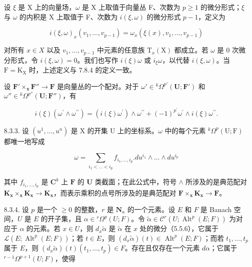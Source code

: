 设 \(\xi\) 是 X 上的向量场，\(\omega\) 是 X 上取值于向量丛 F、次数为 \(p \geqslant 1\) 的微分形式；\(\xi\) 与 \(\omega\) 的内积是 X 上取值于 F、次数为 \(i(\xi, \omega)\) 的微分形式 \(p - 1\)，定义为

\[
i (\xi , \omega) _ {x} (v _ {1}, \dots , v _ {p - 1}) = \omega_ {x} (\xi (x), v _ {1}, \dots , v _ {p - 1})\tag{3}
\]

对所有 \(x \in X\) 以及 \(v_{1}, \ldots, v_{p-1}\) 中元素的任意族 \(\mathrm{T}_{x}(\mathrm{X})\) 都成立。若 \(\omega\) 是 0 次微分形式，令 \(i(\xi, \omega) = 0\)。我们也写作 \(i(\xi)\omega\) 或 \(i_{\xi}\omega\)，以代替 \(i(\xi, \omega)\)。当 \(\mathrm{F} = \mathrm{K}_{\mathrm{X}}\) 时，上述定义与 7.8.4 的定义一致。

设 \(\mathbf{F}' \times_{\mathbf{x}} \mathbf{F}'' \to \mathbf{F}\) 是向量丛的一个配对。对于 \(\omega' \in {}^k \Omega^{p'}(\mathbf{U}; \mathbf{F}')\) 和 \(\omega'' \in {}^k \Omega^{p''}(\mathbf{U}; \mathbf{F}'')\)，有

\[
i (\xi) \left(\omega^ {\prime} \wedge \omega^ {\prime \prime}\right) = \left(i (\xi) \omega^ {\prime}\right) \wedge \omega^ {\prime \prime} + (- 1) ^ {p ^ {\prime}} \omega^ {\prime} \wedge i (\xi) \omega^ {\prime \prime}.\tag{4}
\]

8.3.3. 设 \((u^{1},\ldots,u^{n})\) 是 X 的开集 U 上的坐标系。\(\omega\) 中的每个元素 \({}^{k}\Omega^{p}(\mathrm{U};\mathrm{F})\) 都唯一地写成

\[
\omega = \sum_ {i _ {1} <   \dots <   i _ {p}} f _ {i _ {1}, \dots , i _ {p}}. d u ^ {i _ {1}} \wedge \dots \wedge d u ^ {i _ {p}}
\]

其中 \(f_{i_1,\ldots,i_p}\) 是 \(\mathbf{C}^k\) 上 \(\mathbf{F}\) 的 \(\mathbf{U}\) 类截面；在此公式中，符号 \(\wedge\) 所涉及的是典范配对 \(\mathbf{K}_{\mathbf{x}} \times_{\mathbf{x}} \mathbf{K}_{\mathbf{x}} \to \mathbf{K}_{\mathbf{x}}\)，而表示乘积的点号所涉及的是典范配对 \(\mathbf{F} \times_{\mathbf{x}} \mathbf{K}_{\mathbf{x}} \to \mathbf{F}\)。

8.3.4. 设 \(p\) 是一个 \(\geqslant 0\) 的整数，\(r\) 是 \(\mathbf{N}_{\kappa}\) 的一个元素。设 \(E\) 和 \(F\) 是 Banach 空间，\(U\) 是 \(E\) 的开子集，且 \(\alpha \in {}^r\Omega^p(U;F)\)。令 \(\tilde{\alpha} \in \mathcal{C}^r (U; \operatorname{Alt}^p(E;F))\) 为对应于 \(\alpha\) 的元素。若 \(x \in U\)，则 \(d_x\tilde{\alpha}\) 是 \(\tilde{\alpha}\) 在 \(x\) 处的微分（5.5.6），它属于 \(\mathcal{L}(E; \operatorname{Alt}^p(E;F))\)；若 \(t \in E\)，则 \((d_x\tilde{\alpha})(t) \in \operatorname{Alt}^p(E;F)\)；而若 \(t_1, \ldots, t_p\) 属于 \(E\)，则 \((d_x\tilde{\alpha})(t)(t_1, \ldots, t_p) \in F\)。存在且仅存在一个元素 \(d\alpha\)；它属于 \({}^{r-1}\Omega^{p+1}(U;F)\)，使得

